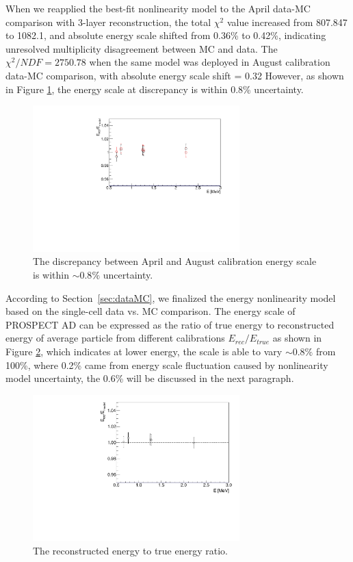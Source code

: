 When we reapplied the best-fit nonlinearity model to the April data-MC comparison with 3-layer reconstruction, the total $\chi^2$ value increased from 807.847 to 1082.1, and absolute energy scale shifted from 0.36\% to 0.42\%, indicating unresolved multiplicity disagreement between MC and data.
The $\chi^2/NDF = 2750.78$ when the same model was deployed in August calibration data-MC comparison, with absolute energy scale shift = 0.32
However, as shown in Figure \ref{fig:compare}, the energy scale at discrepancy is within 0.8\% uncertainty.

\begin{figure}[h!]
\centering
\includegraphics[width=80mm]{Figures/EScaleCompare.pdf}
\caption{The discrepancy between April and August calibration energy scale is within $\sim0.8\%$ uncertainty.}
\label{fig:compare}
\end{figure}

\newpage

According to Section~\ref{sec:dataMC}, we finalized the energy nonlinearity model based on the single-cell data vs. MC comparison.
The energy scale of PROSPECT AD can be expressed as the ratio of true energy to reconstructed energy of average particle from different calibrations $E_{rec}/E_{true}$ as shown in Figure \ref{fig:escale}, which indicates at lower energy, the scale is able to vary $\sim0.8\%$ from 100\%, where 0.2\% came from energy scale fluctuation caused by nonlinearity model uncertainty, the 0.6\% will be discussed in the next paragraph.

\begin{figure}[h!]
\centering
\includegraphics[width=80mm]{Figures/EScale.pdf}
\caption{The reconstructed energy to true energy ratio.}
\label{fig:escale}
\end{figure}

